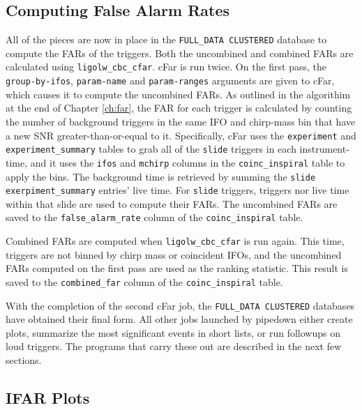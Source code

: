 \subsection{Computing False Alarm Rates}

All of the pieces are now in place in the \verb|FULL_DATA CLUSTERED| database to compute the \acp{FAR} of the triggers. Both the uncombined and combined \acp{FAR} are calculated using \verb|ligolw_cbc_cfar|. cFar is run twice. On the first pass, the \verb|group-by-ifos|, \verb|param-name| and \verb|param-ranges| arguments are given to cFar, which causes it to compute the uncombined \acp{FAR}. As outlined in the algorithim at the end of Chapter \ref{ch:far}, the \ac{FAR} for each trigger is calculated by counting the number of background triggers in the same \ac{IFO} and chirp-mass bin that have a new \ac{SNR} greater-than-or-equal to it. Specifically, cFar uses the \verb|experiment| and \verb|experiment_summary| tables to grab all of the \verb|slide| triggers in each instrument-time, and it uses the \verb|ifos| and \verb|mchirp| columns in the \verb|coinc_inspiral| table to apply the bins. The background time is retrieved by summing the \verb|slide| \verb|exerpiment_summary| entries' live time. For \verb|slide| triggers, triggers nor live time within that slide are used to compute their \acp{FAR}. The uncombined \acp{FAR} are saved to the \verb|false_alarm_rate| column of the \verb|coinc_inspiral| table.

Combined \acp{FAR} are computed when \verb|ligolw_cbc_cfar| is run again. This time, triggers are not binned by chirp mass or coincident \acp{IFO}, and the uncombined \acp{FAR} computed on the first pass are used as the ranking statistic. This result is saved to the \verb|combined_far| column of the \verb|coinc_inspiral| table.

With the completion of the second cFar job, the \verb|FULL_DATA CLUSTERED| databases have obtained their final form. All other jobs launched by pipedown either create plots, summarize the most significant events in short lists, or run followups on loud triggers. The programs that carry these out are described in the next few sections.

\subsection{IFAR Plots}

